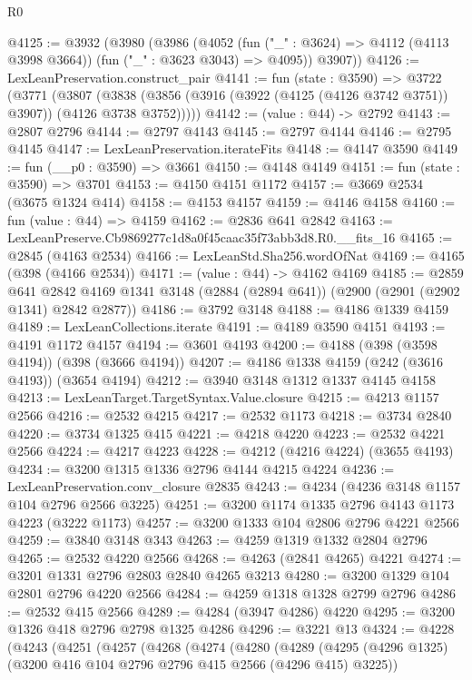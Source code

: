 \begin{lexlean}{R0}
\begin{coremodule}
@4125 := @3932
    (@3980
      (@3986
        (@4052 (fun ("_" : @3624) => @4112 (@4113 @3998 @3664)) (fun ("_" : @3623 @3043) => @4095))
        @3907))
@4126 := LexLeanPreservation.construct_pair
@4141 := fun (state : @3590) =>
  @3722
    (@3771
      (@3807 (@3838 (@3856 (@3916 (@3922 (@4125 (@4126 @3742 @3751)) @3907)) (@4126 @3738 @3752)))))
@4142 := (value : @44) -> @2792
@4143 := @2807 @2796
@4144 := @2797 @4143
@4145 := @2797 @4144
@4146 := @2795 @4145
@4147 := LexLeanPreservation.iterateFits
@4148 := @4147 @3590
@4149 := fun (__p0 : @3590) => @3661
@4150 := @4148 @4149
@4151 := fun (state : @3590) => @3701
@4153 := @4150 @4151 @1172
@4157 := @3669 @2534 (@3675 @1324 @414)
@4158 := @4153 @4157
@4159 := @4146 @4158
@4160 := fun (value : @44) => @4159
@4162 := @2836 @641 @2842
@4163 := LexLeanPreserve.Cb9869277c1d8a0f45caac35f73abb3d8.R0.__fits_16
@4165 := @2845 (@4163 @2534)
@4166 := LexLeanStd.Sha256.wordOfNat
@4169 := @4165 (@398 (@4166 @2534))
@4171 := (value : @44) -> @4162 @4169
@4185 := @2859
    @641
    @2842
    @4169
    @1341
    @3148
    (@2884 (@2894 @641))
    (@2900 (@2901 (@2902 @1341) @2842 @2877))
@4186 := @3792 @3148
@4188 := @4186 @1339 @4159
@4189 := LexLeanCollections.iterate
@4191 := @4189 @3590 @4151
@4193 := @4191 @1172 @4157
@4194 := @3601 @4193
@4200 := @4188 (@398 (@3598 @4194)) (@398 (@3666 @4194))
@4207 := @4186 @1338 @4159 (@242 (@3616 @4193)) (@3654 @4194)
@4212 := @3940 @3148 @1312 @1337 @4145 @4158
@4213 := LexLeanTarget.TargetSyntax.Value.closure
@4215 := @4213 @1157 @2566
@4216 := @2532 @4215
@4217 := @2532 @1173
@4218 := @3734 @2840
@4220 := @3734 @1325 @415
@4221 := @4218 @4220
@4223 := @2532 @4221 @2566
@4224 := @4217 @4223
@4228 := @4212 (@4216 @4224) (@3655 @4193)
@4234 := @3200 @1315 @1336 @2796 @4144 @4215 @4224
@4236 := LexLeanPreservation.conv_closure @2835
@4243 := @4234 (@4236 @3148 @1157 @104 @2796 @2566 @3225)
@4251 := @3200 @1174 @1335 @2796 @4143 @1173 @4223 (@3222 @1173)
@4257 := @3200 @1333 @104 @2806 @2796 @4221 @2566
@4259 := @3840 @3148 @343
@4263 := @4259 @1319 @1332 @2804 @2796
@4265 := @2532 @4220 @2566
@4268 := @4263 (@2841 @4265) @4221
@4274 := @3201 @1331 @2796 @2803 @2840 @4265 @3213
@4280 := @3200 @1329 @104 @2801 @2796 @4220 @2566
@4284 := @4259 @1318 @1328 @2799 @2796
@4286 := @2532 @415 @2566
@4289 := @4284 (@3947 @4286) @4220
@4295 := @3200 @1326 @418 @2796 @2798 @1325 @4286
@4296 := @3221 @13
@4324 := @4228
    (@4243
      (@4251
        (@4257
          (@4268
            (@4274
              (@4280
                (@4289
                  (@4295 (@4296 @1325) (@3200 @416 @104 @2796 @2796 @415 @2566 (@4296 @415) @3225))

\end{coremodule}
\end{lexlean}
